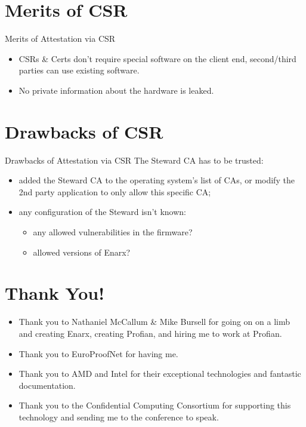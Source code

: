 \documentclass[graphics]{beamer}
\begin{document}
\section{Merits of CSR}
\begin{frame}{Merits of Attestation via CSR}
\begin{itemize}
    \item CSRs \& Certs don't require special software on the client end, second/third parties can use existing software.
    \item No private information about the hardware is leaked.
\end{itemize}
\end{frame}

\section{Drawbacks of CSR}
\begin{frame}{Drawbacks of Attestation via CSR}
The Steward CA has to be trusted:
\begin{itemize}
    \item added the Steward CA to the operating system's list of CAs, or modify the 2nd party application to only allow this specific CA;
    \item any configuration of the Steward isn't known:
    \begin{itemize}
        \item any allowed vulnerabilities in the firmware?
        \item allowed versions of Enarx?
    \end{itemize}
\end{itemize}
\end{frame}

\section{Thank You!}
\begin{frame}
\begin{itemize}
    \item Thank you to Nathaniel McCallum \& Mike Bursell for going on on a limb and creating Enarx, creating Profian, and hiring me to work at Profian.
    \item Thank you to EuroProofNet for having me.
    \item Thank you to AMD and Intel for their exceptional technologies and fantastic documentation.
    \item Thank you to the Confidential Computing Consortium for supporting this technology and sending me to the conference to speak.
\end{itemize}
\end{frame}
\end{document}

